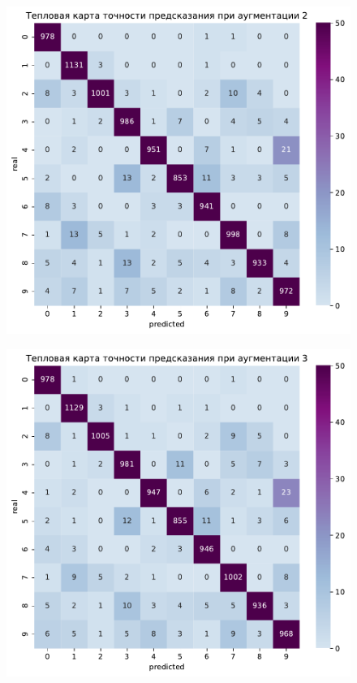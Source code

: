 \documentclass{article}
\begin{document}
\begin{figure}[h]
{\begin{minipage}{8cm}
		\end{minipage}
		\label{app:violet1}
	}
	\subfigure
	{
		\begin{minipage}{8cm}
			\centering
			\includegraphics[scale=0.35]{TASK1 warm map 2.pdf}
		\end{minipage}
		\label{app:violet2}
	}
	\subfigure
	{
        \begin{minipage}{8cm}
            \centering
            \includegraphics[scale=0.35]{TASK1 warm map 3.pdf}

\end{minipage}}
\end{figure}
\end{document}

